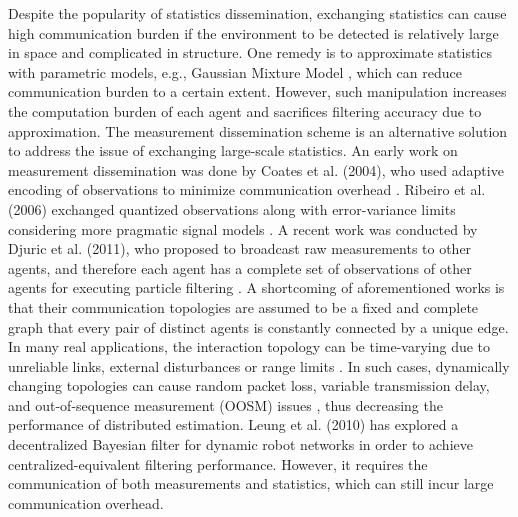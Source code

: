 	
	Despite the popularity of statistics dissemination, exchanging statistics can cause high communication burden if the environment to be detected is relatively large in space and complicated in structure. 
	One remedy is to approximate statistics with parametric models, e.g., Gaussian Mixture Model \cite{sheng2005distributed}, which can reduce communication burden to a certain extent. 
	However, such manipulation increases the computation burden of each agent and sacrifices filtering  accuracy due to approximation.
	The measurement dissemination scheme is an alternative solution to address the issue of exchanging large-scale statistics. 
	An early work on measurement dissemination was done by Coates et al. (2004), who used adaptive encoding of observations to minimize communication overhead \cite{coates2004distributed}. Ribeiro et al. (2006) exchanged quantized observations along with error-variance limits considering more pragmatic signal models \cite{ribeiro2006bandwidth}.
	A recent work was conducted by Djuric et al. (2011), who proposed to broadcast raw measurements to other agents, and therefore each agent has a complete set of observations of other agents for executing particle filtering \cite{djuric2011non}.  
	A shortcoming of aforementioned works is that their communication topologies are assumed to be a fixed and complete graph that every pair of distinct agents is constantly connected by a unique edge. 
	In many real applications, the interaction topology can be time-varying due to unreliable links, external disturbances or range limits \cite{xiao2008asynchronous}.
	In such cases, dynamically changing topologies can cause random packet loss, variable transmission delay, and out-of-sequence measurement (OOSM) issues \cite{xia2009networked}, thus decreasing the performance of distributed estimation.
	Leung et al. (2010) has explored a decentralized Bayesian filter for dynamic robot networks \cite{leung2010decentralized} in order to achieve centralized-equivalent filtering performance.
	However, it requires the communication of both measurements and statistics, which can still incur large communication overhead.
		
